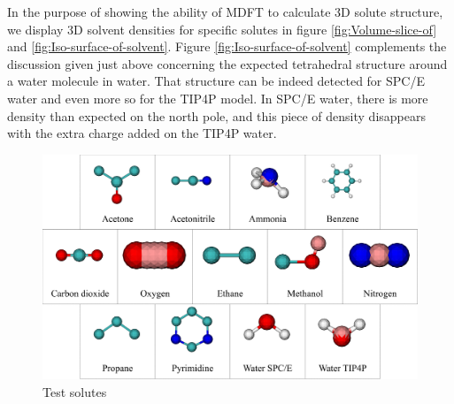 In the purpose of showing the ability of \acs{MDFT} to calculate
3D solute structure, we display 3D solvent densities for specific
solutes in figure \ref{fig:Volume-slice-of} and \ref{fig:Iso-surface-of-solvent}.
Figure \ref{fig:Iso-surface-of-solvent} complements the discussion
given just above concerning the expected tetrahedral structure around
a water molecule in water. That structure can be indeed detected for
SPC/E water and even more so for the TIP4P model. In SPC/E water,
there is more density than expected on the north pole, and this piece
of density disappears with the extra charge added on the TIP4P water.\\

\begin{figure}[H]
\begin{centering}
\includegraphics[width=1\columnwidth]{_figure/app_solute_var}
\par\end{centering}
\caption{Test solutes\label{fig:Test-solutes-2}}
\end{figure}

